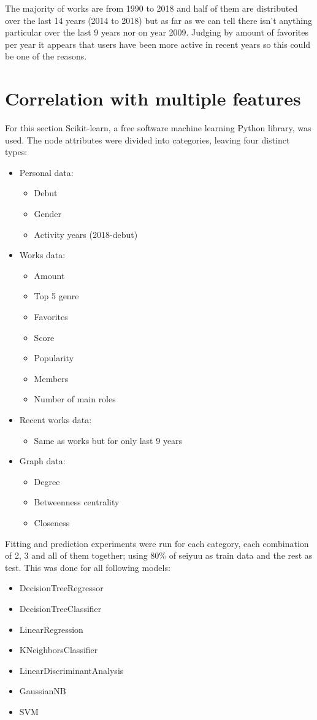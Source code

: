The majority of works are from 1990 to 2018 and half of them are distributed over the last 14 years (2014 to 2018) but as far as we can tell there isn’t anything particular over the last 9 years nor on year 2009. Judging by amount of favorites per year it appears that users have been more active in recent years so this could be one of the reasons.

\section{Correlation with multiple features}
For this section Scikit-learn, a free software machine learning Python library, was used. The node attributes were divided into categories, leaving four distinct types:

\begin{itemize}
	\item Personal data:
	\begin{itemize}
		\item Debut
		\item Gender
		\item Activity years (2018-debut)
	\end{itemize}
	\item Works data:
	\begin{itemize}
		\item Amount
		\item Top 5 genre
		\item Favorites
		\item Score
		\item Popularity
		\item Members
		\item Number of main roles
	\end{itemize}
	\item Recent works data:
	\begin{itemize}
		\item Same as works but for only last 9 years
	\end{itemize}	
	\item Graph data:
	\begin{itemize}
		\item Degree
		\item Betweenness centrality
		\item Closeness
	\end{itemize}
\end{itemize}

Fitting and prediction experiments were run for each category, each combination of 2, 3 and all of them together; using 80\% of seiyuu as train data and the rest as test. This was done for all following models:
\begin{itemize}
	\item DecisionTreeRegressor
	\item DecisionTreeClassifier
	\item LinearRegression
	\item KNeighborsClassifier
	\item LinearDiscriminantAnalysis
	\item GaussianNB
	\item SVM
\end{itemize}

